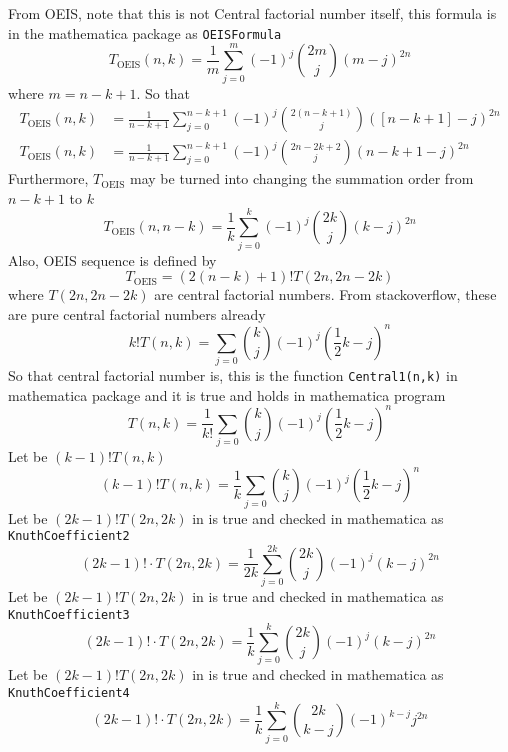 From OEIS, note that this is not Central factorial number itself, this formula is in the mathematica package as
\texttt{OEISFormula}
\begin{equation*}
    T_{\mathrm{OEIS}} (n,k) = \frac{1}{m} \sum_{j=0}^{m} (-1)^{j} \binom{2m}{j} (m-j)^{2n}
\end{equation*}
where $m=n-k+1$.
So that
\begin{equation}
    \begin{split}
        T_{\mathrm{OEIS}} (n,k) &= \frac{1}{n-k+1} \sum_{j=0}^{n-k+1} (-1)^{j} \binom{2(n-k+1)}{j} ([n-k+1]-j)^{2n} \\
        T_{\mathrm{OEIS}} (n,k) &= \frac{1}{n-k+1} \sum_{j=0}^{n-k+1} (-1)^{j} \binom{2n-2k+2}{j} (n-k+1-j)^{2n}
    \end{split}\label{eq:luschny-oeis}
\end{equation}
Furthermore, $T_{\mathrm{OEIS}}$ may be turned into changing the summation order from $n-k+1$ to $k$
\begin{equation*}
    T_{\mathrm{OEIS}} (n, n-k) = \frac{1}{k} \sum_{j=0}^{k} (-1)^{j} \binom{2k}{j} (k-j)^{2n}
\end{equation*}
Also, OEIS sequence is defined by
\begin{equation*}
    T_{\mathrm{OEIS}} = (2(n-k) + 1)! T(2n, 2n-2k)
\end{equation*}
where $T(2n, 2n-2k)$ are central factorial numbers.
From stackoverflow, these are pure central factorial numbers already
\begin{equation*}
    k! T(n,k) = \sum_{j=0} \binom{k}{j} (-1)^{j} \left( \frac{1}{2}k - j \right)^{n}
\end{equation*}
So that central factorial number is, this is the function \texttt{Central1(n,k)} in mathematica package
and it is true and holds in mathematica program
\begin{equation*}
    T(n,k) = \frac{1}{k!} \sum_{j=0} \binom{k}{j} (-1)^{j} \left( \frac{1}{2}k - j \right)^{n}
\end{equation*}
Let be $(k-1)! T(n,k)$
\begin{equation*}
(k-1)
    !T(n,k) = \frac{1}{k} \sum_{j=0} \binom{k}{j} (-1)^{j} \left( \frac{1}{2}k - j \right)^{n}
\end{equation*}
Let be $(2k-1)! T(2n, 2k)$ in is true and checked in mathematica as \texttt{KnuthCoefficient2}
\begin{equation*}
    (2k-1)! \cdot T(2n, 2k) = \frac{1}{2k} \sum_{j=0}^{2k} \binom{2k}{j} (-1)^{j} (k-j)^{2n}
\end{equation*}
Let be $(2k-1)! T(2n, 2k)$ in is true and checked in mathematica as \texttt{KnuthCoefficient3}
\begin{equation*}
    (2k-1)! \cdot T(2n, 2k) = \frac{1}{k} \sum_{j=0}^{k} \binom{2k}{j} (-1)^{j} (k-j)^{2n}
\end{equation*}
Let be $(2k-1)! T(2n, 2k)$ in is true and checked in mathematica as \texttt{KnuthCoefficient4}
\begin{equation*}
(2k-1)! \cdot T(2n, 2k) = \frac{1}{k} \sum_{j=0}^{k} \binom{2k}{k-j} (-1)^{k-j} j^{2n}
\end{equation*}